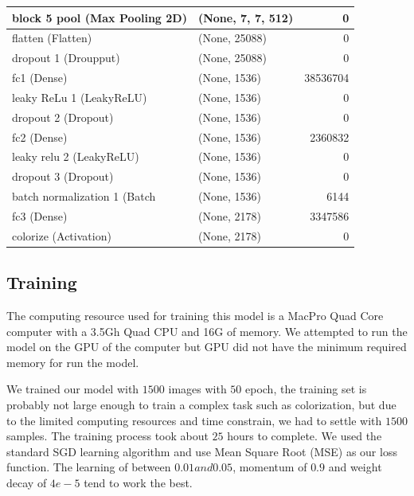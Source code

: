 \documentclass[12pt]{article}
\begin{document}
\begin{table}[H]
\begin{tabular}{|l|l|r|}
		block 5 pool (Max Pooling 2D) &  (None, 7, 7, 512)      &    0           \\ \hline 
		flatten (Flatten)             &  (None, 25088)          &    0           \\ \hline 
		dropout 1 (Droupput)          &  (None, 25088)          &    0           \\ \hline
		fc1 (Dense)                   &  (None, 1536)           &    38536704    \\ \hline
        leaky ReLu 1 (LeakyReLU)      &  (None, 1536)           &    0           \\ \hline
        dropout 2 (Dropout)           &  (None, 1536)           &    0           \\ \hline
        fc2 (Dense)                   &  (None, 1536)           &    2360832     \\ \hline
        leaky relu 2 (LeakyReLU)      &  (None, 1536)           &    0           \\ \hline
        dropout 3 (Dropout)           &  (None, 1536)           &    0           \\ \hline
        batch normalization 1 (Batch  &  (None, 1536)           &    6144        \\ \hline
        fc3 (Dense)                   &  (None, 2178)           &    3347586     \\ \hline
        colorize (Activation)         &  (None, 2178)           &    0           \\ \hline 
	\end{tabular}
\end{table}


\subsection{Training}
The computing resource used for training this model is a MacPro Quad Core computer with a 3.5Gh Quad CPU and 16G of memory. We attempted to run the model on the GPU of the computer but GPU did not have the minimum required memory for run the model. 


We trained our model with $1500$ images with $50$ epoch, the training set is probably not large enough to train a complex task such as colorization, but due to the limited computing resources and time constrain, we had to settle with $1500$ samples. The training process took about $25$ hours to complete. We used the standard SGD learning algorithm and use Mean Square Root (MSE) as our loss function. The learning of between $0.01 and 0.05$, momentum of $0.9$ and weight decay of $4e-5$ tend to work the best. 
\end{document}

